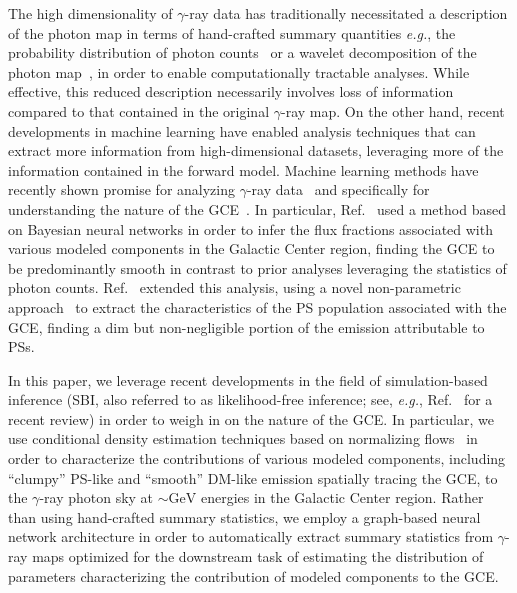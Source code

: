 \documentclass[prd,aps,10pt,nofootinbib,twocolumn,superscriptaddress,preprintnumbers,balancelastpage,longbibliography]{revtex4-1}
\begin{document}
The high dimensionality of $\gamma$-ray data has traditionally necessitated a description of the photon map in terms of hand-crafted summary quantities \emph{e.g.}, the probability distribution of photon counts~\cite{Lee:2014mza,Lee:2015fea} or a wavelet decomposition of the photon map~\cite{Bartels:2015aea,Balaji:2018rwz,McDermott:2015ydv}, in order to enable computationally tractable analyses. While effective, this reduced description necessarily involves loss of information compared to that contained in the original $\gamma$-ray map. On the other hand, recent developments in machine learning have enabled analysis techniques that can extract more information from high-dimensional datasets, leveraging more of the information contained in the forward model. Machine learning methods have recently shown promise for analyzing $\gamma$-ray data~\cite{Caron:2021map} and specifically for understanding the nature of the \Fermi GCE~\cite{List:2020mzd,List:2021aer,Caron:2017udl}. In particular, Ref.~\cite{List:2020mzd} used a method based on Bayesian neural networks in order to infer the flux fractions associated with various modeled components in the Galactic Center region, finding the GCE to be predominantly smooth in contrast to prior analyses leveraging the statistics of photon counts. Ref.~\cite{List:2021aer} extended this analysis, using a novel non-parametric approach~\cite{list2021earth} to extract the characteristics of the PS population associated with the GCE, finding a dim but non-negligible portion of the emission attributable to PSs.

In this paper, we leverage recent developments in the field of simulation-based inference (SBI, also referred to as likelihood-free inference; see, \emph{e.g.}, Ref.~\cite{cranmer2020frontier} for a recent review)
in order to weigh in on the nature of the GCE. In particular, we use conditional density estimation techniques based on normalizing flows~\cite{papamakarios2019normalizing,rezende2015variational} in order to characterize the contributions of various modeled components, including ``clumpy'' PS-like and ``smooth'' DM-like emission spatially tracing the GCE, to the $\gamma$-ray photon sky at $\sim\mathrm{GeV}$ energies in the Galactic Center region. Rather than using hand-crafted summary statistics, we employ a graph-based neural network architecture in order to automatically extract summary statistics from $\gamma$-ray maps optimized for the downstream task of estimating the distribution of parameters characterizing the contribution of modeled components to the GCE.
\end{document}
